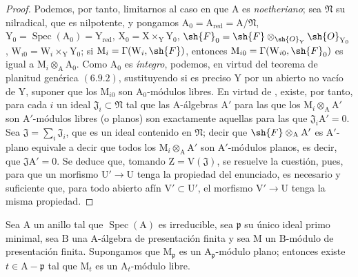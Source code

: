 \begin{proof}
Podemos, por tanto, limitarnos al caso en que $\mathrm{A}$ es \emph{noetheriano}; sea $\mathfrak{N}$ su nilradical, que es
nilpotente, y pongamos $\mathrm{A}_0=\mathrm{A}_{\mathrm{red}}=\mathrm{A}/\mathfrak{N}$, $\mathrm{Y}_0=\operatorname{Spec}(\mathrm{A}_0)=\mathrm{Y}_{\mathrm{red}}$, $\mathrm{X}_0=\mathrm{X}\times_\mathrm{Y}\mathrm{Y}_0$, $\sh{F}_0=\sh{F}\otimes_{\sh{O}_\mathrm{Y}}\sh{O}_{\mathrm{Y}_0}$,
$\mathrm{W}_{i0}=\mathrm{W}_i\times_\mathrm{Y}\mathrm{Y}_0$; si $\mathrm{M}_i=\Gamma(\mathrm{W}_i,\sh{F})$, entonces $\mathrm{M}_{i0}=\Gamma(\mathrm{W}_{i0},\sh{F}_0)$ es igual a $\mathrm{M}_i\otimes_\mathrm{A}\mathrm{A}_0$.
Como $\mathrm{A}_0$ es \emph{íntegro}, podemos, en virtud del teorema de planitud genérica $(6.9.2)$,
sustituyendo si es preciso $\mathrm{Y}$ por un abierto no vacío de $\mathrm{Y}$, suponer que los $\mathrm{M}_{i0}$ son
$\mathrm{A}_0$-módulos libres. En virtud de , existe, por tanto, para cada $i$ un ideal $\mathfrak{J}_i\subset\mathfrak{N}$ tal
que las $\mathrm{A}$-álgebras $\mathrm{A}'$ para las que los $\mathrm{M}_i\otimes_\mathrm{A}\mathrm{A}'$ son $\mathrm{A}'$-módulos libres (o planos)
son exactamente aquellas para las que $\mathfrak{J}_i\mathrm{A}'=0$. Sea $\mathfrak{J}=\sum_i\mathfrak{J}_i$, que es un ideal contenido
en $\mathfrak{N}$; decir que $\sh{F}\otimes_{\mathrm{A}}\mathrm{A}'$ es $\mathrm{A}'$-plano equivale a decir que todos los $\mathrm{M}_i\otimes_\mathrm{A}\mathrm{A}'$ son
$\mathrm{A}'$-módulos planos, es decir, que $\mathfrak{J}\mathrm{A}'=0$. Se deduce que, tomando $\mathrm{Z}=\mathrm{V}(\mathfrak{J})$, se
resuelve la cuestión, pues, para que un morfismo $\mathrm{U}'\to\mathrm{U}$ tenga la propiedad del enunciado,
es necesario y suficiente que, para todo abierto afín $\mathrm{V}'\subset\mathrm{U}'$, el morfismo $\mathrm{V}'\to\mathrm{U}$
tenga la misma propiedad.
\end{proof}

\begin{corollary}[11.4.6]
\label{IV.11.4.6}
Sea $\mathrm{A}$ un anillo tal que $\operatorname{Spec}(\mathrm{A})$ es irreducible, sea $\mathfrak{p}$ su único
ideal primo minimal, sea $\mathrm{B}$ una $\mathrm{A}$-álgebra de presentación finita y sea $\mathrm{M}$ un $\mathrm{B}$-módulo de presentación finita.
Supongamos que $\mathrm{M}_\mathfrak{p}$ es un $\mathrm{A}_\mathfrak{p}$-módulo plano; entonces existe $t\in\mathrm{A}-\mathfrak{p}$ tal que $\mathrm{M}_t$ es un $\mathrm{A}_t$-módulo libre.
\end{corollary}

